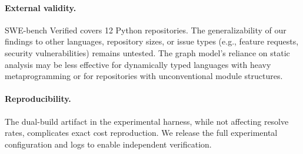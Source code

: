 \paragraph{External validity.} SWE-bench Verified covers 12 Python repositories. The generalizability of our findings to other languages, repository sizes, or issue types (e.g., feature requests, security vulnerabilities) remains untested. The graph model's reliance on static analysis may be less effective for dynamically typed languages with heavy metaprogramming or for repositories with unconventional module structures.

\paragraph{Reproducibility.} The dual-build artifact in the experimental harness, while not affecting resolve rates, complicates exact cost reproduction. We release the full experimental configuration and logs to enable independent verification.
